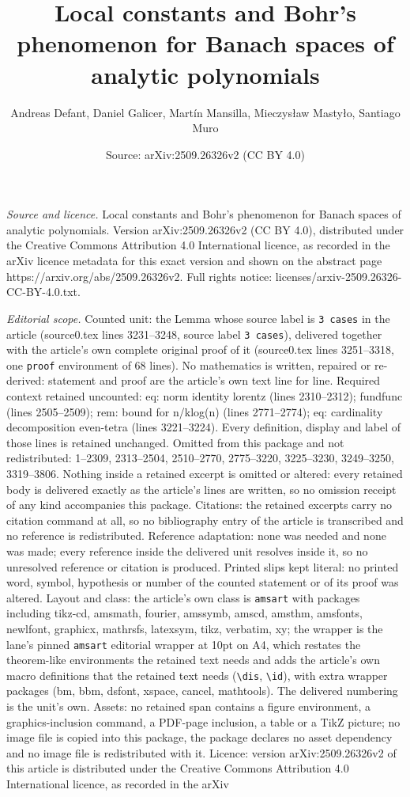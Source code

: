 \documentclass[10pt,a4paper]{amsart}
\title[Local constants and Bohr's phenomenon for Banach spaces of a]{Local constants and Bohr's phenomenon for Banach spaces of analytic polynomials}
\author{Andreas Defant, Daniel Galicer, Mart\'in Mansilla, Mieczys{\l}aw Masty{\l}o, Santiago Muro}
\date{Source: arXiv:2509.26326v2 (CC BY 4.0)}
\begin{document}
\maketitle

\noindent\emph{Source and licence.} Local constants and Bohr's phenomenon for Banach spaces of analytic polynomials. Version arXiv:2509.26326v2 (CC BY 4.0), distributed under the Creative Commons Attribution 4.0 International licence, as recorded in the arXiv licence metadata for this exact version and shown on the abstract page https://arxiv.org/abs/2509.26326v2. Full rights notice: licenses/arxiv-2509.26326-CC-BY-4.0.txt.\par\smallskip

\noindent\textit{Editorial scope.} Counted unit: the Lemma whose source label is \texttt{3 cases} in the article (source0.tex lines 3231--3248, source label \texttt{3 cases}), delivered together with the article's own complete original proof of it (source0.tex lines 3251--3318, one \texttt{proof} environment of 68 lines). No mathematics is written, repaired or re-derived: statement and proof are the article's own text line for line. Required context retained uncounted: eq: norm identity lorentz (lines 2310--2312); fundfunc (lines 2505--2509); rem: bound for n/klog(n) (lines 2771--2774); eq: cardinality decomposition even-tetra (lines 3221--3224). Every definition, display and label of those lines is retained unchanged. Omitted from this package and not redistributed: 1--2309, 2313--2504, 2510--2770, 2775--3220, 3225--3230, 3249--3250, 3319--3806. Nothing inside a retained excerpt is omitted or altered: every retained body is delivered exactly as the article's lines are written, so no omission receipt of any kind accompanies this package. Citations: the retained excerpts carry no citation command at all, so no bibliography entry of the article is transcribed and no reference is redistributed. Reference adaptation: none was needed and none was made; every reference inside the delivered unit resolves inside it, so no unresolved reference or citation is produced. Printed slips kept literal: no printed word, symbol, hypothesis or number of the counted statement or of its proof was altered. Layout and class: the article's own class is \texttt{amsart} with packages including tikz-cd, amsmath, fourier, amssymb, amscd, amsthm, amsfonts, newlfont, graphicx, mathrsfs, latexsym, tikz, verbatim, xy; the wrapper is the lane's pinned \texttt{amsart} editorial wrapper at 10pt on A4, which restates the theorem-like environments the retained text needs and adds the article's own macro definitions that the retained text needs (\texttt{\textbackslash dis}, \texttt{\textbackslash id}), with extra wrapper packages (bm, bbm, dsfont, xspace, cancel, mathtools). The delivered numbering is the unit's own. Assets: no retained span contains a figure environment, a graphics-inclusion command, a PDF-page inclusion, a table or a TikZ picture; no image file is copied into this package, the package declares no asset dependency and no image file is redistributed with it. Licence: version arXiv:2509.26326v2 of this article is distributed under the Creative Commons Attribution 4.0 International licence, as recorded in the arXiv 
\end{document}
